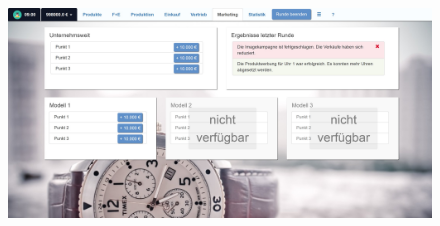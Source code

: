 \begin{figure} [h]
	\centering
	\includegraphics[scale=0.1]{img/bilder_layout/Spiel8.jpg} 
\end{figure}